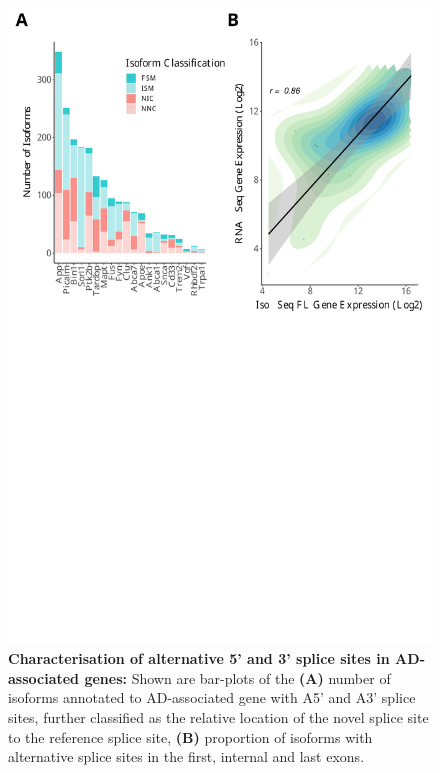 \begin{figure}[]
	\centering
	\includegraphics[page=10,trim={0 20cm 0 0cm},clip,scale = 0.55]{Figures/ONTvsIsoSeq.pdf}
	\captionsetup{width=0.95\textwidth}
	\caption[Characterisation of alternative 5' and 3' splice sites in AD-associated genes]%
	{\textbf{Characterisation of alternative 5' and 3' splice sites in AD-associated genes:} Shown are bar-plots of the \textbf{(A)} number of isoforms annotated to AD-associated gene with A5' and A3' splice sites, further classified as the relative location of the novel splice site to the reference splice site, \textbf{(B)} proportion of isoforms with alternative splice sites in the first, internal and last exons.}
	\label{fig:A5A3_targeted}
\end{figure}

